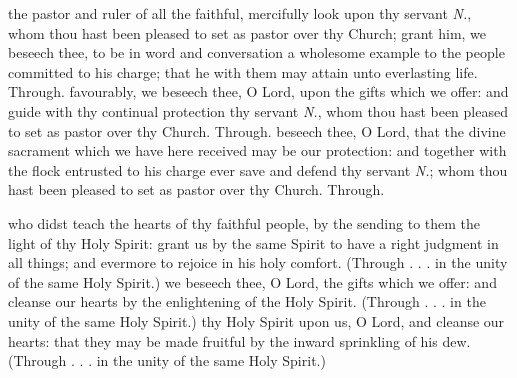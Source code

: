 \begin{multicols}{2}
   \label{SPChiefBishop}
    the pastor and ruler of all the faithful, mercifully look upon thy servant \emph{N.}, whom thou hast been pleased to set as pastor over thy Church; grant him, we beseech thee, to be in word and conversation a wholesome example to the people committed to his charge; that he with them may attain unto everlasting life. Through.
    favourably, we beseech thee, O Lord, upon the gifts which we offer: and guide with thy continual protection thy servant \textit{N.}, whom thou hast been pleased to set as pastor over thy Church. Through.
    beseech thee, O Lord, that the divine sacrament which we have here received may be our protection: and together with the flock entrusted to his charge ever save and defend thy servant \textit{N.}; whom thou hast been pleased to set as pastor over thy Church. Through.
   
   \label{SPHolyGhost}
    who didst teach the hearts of thy faithful people, by the sending to them the light of thy Holy Spirit: grant us by the same Spirit to have a right judgment in all things; and evermore to rejoice in his holy comfort. (Through . . . in the unity of the same Holy Spirit.)
    we beseech thee, O Lord, the gifts which we offer: and cleanse our hearts by the enlightening of the Holy Spirit. (Through . . . in the unity of the same Holy Spirit.)
    thy Holy Spirit upon us, O Lord, and cleanse our hearts: that they may be made fruitful by the inward sprinkling of his dew. (Through . . . in the unity of the same Holy Spirit.)


\end{multicols}

